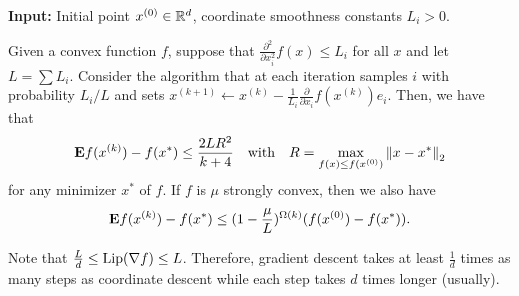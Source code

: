 \begin{algorithm2e}[H]

\caption{$\mathtt{CoordinateDescent}$ (CD)}

\SetAlgoLined

\textbf{Input:} Initial point $x^{(0)}\in\mathbb{R}^{d}$, coordinate smoothness
constants $L_{i}>0$.


\end{algorithm2e}
\begin{thm}
\label{thm:coordinate_descent}Given a convex function $f$, suppose
that $\frac{\partial^{2}}{\partial x^{2}_{i}}f(x)\leq L_{i}$ for
all $x$ and let $L=\sum L_{i}$. Consider the algorithm that at each
iteration samples $i$ with probability $L_{i}/L$ and sets $x^{(k+1)}\leftarrow x^{(k)}-\frac{1}{L_{i}}\frac{\partial}{\partial x_{i}}f(x^{(k)})e_{i}$.
Then, we have that 
\[
\mathbf{E} f(x^{(k)})-f(x^{*})\leq\frac{2LR^{2}}{k+4}\quad\text{with}\quad R=\max_{f(x)\leq f(x^{(0)})}\left\Vert x-x^{*}\right\Vert_{2}
\]
for any minimizer $x^{*}$ of $f$. If $f$ is $\mu$ strongly convex,
then we also have 
\[
\mathbf{E} f(x^{(k)})-f(x^{*})\leq(1-\frac{\mu}{L})^{\Omega(k)}(f(x^{(0)})-f(x^{*})).
\]
\end{thm}

\begin{rem*}
Note that $\frac{L}{d}\leq\mathrm{Lip}(\nabla f)\leq L$. Therefore, gradient
descent takes at least $\frac{1}{d}$ times as many steps as coordinate
descent while each step takes $d$ times longer (usually).
\end{rem*}


